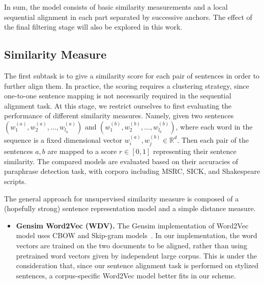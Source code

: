 \documentclass[runningheads]{llncs}
\begin{document}
\begin{spacing}{1.1}
In sum, the model consists of basic similarity measurements and a local sequential alignment in each part separated by successive anchors. The effect of the final filtering stage will also be explored in this work.


\subsection{Similarity Measure}

The first subtask is to give a similarity score for each pair of sentences in order to further align them. In practice, the scoring requires a clustering strategy, since one-to-one sentence mapping is not necessarily required in the sequential alignment task. At this stage, we restrict ourselves to first evaluating the performance of different similarity measures. Namely, given two sentences $(w_1^{(a)}, w_2^{(a)}, \ldots, w_{l_a}^{(a)})$ and $(w_1^{(b)}, w_2^{(b)}, \ldots, w_{l_b}^{(b)})$, where each word in the sequence is a fixed dimensional vector $w_i^{(a)}, w_j^{(b)}\in \mathbb{R}^d$. Then each pair of the sentences $a, b$ are mapped to a score $r\in [0, 1]$ representing their sentence similarity. The compared models are evaluated based on their accuracies of paraphrase detection task, with corpora including MSRC, SICK, and Shakespeare scripts.

The general approach for unsupervised similarity measure is composed of a (hopefully strong) sentence representation model and a simple distance measure.
\begin{itemize}
	\item \textbf{Gensim Word2Vec (WDV).} The Gensim implementation of Word2Vec model uses CBOW and Skip-gram models~\cite{mikolov2013distributed}. In our implementation, the word vectors are trained on the two documents to be aligned, rather than using pretrained word vectors given by independent large corpus. This is under the consideration that, since our sentence alignment task is performed on stylized sentences, a corpus-specific Word2Vec model better fits in our scheme.
	

\end{itemize}
\end{spacing}
\end{document}
